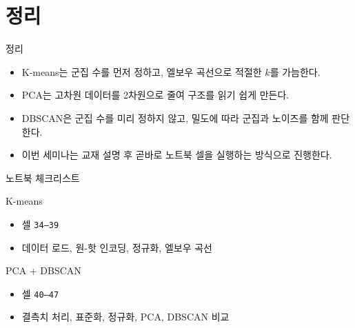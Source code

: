 \documentclass[aspectratio=169]{beamer}
\begin{document}
\section{정리}
\begin{frame}{정리}
\begin{itemize}
    \item K-means는 군집 수를 먼저 정하고, 엘보우 곡선으로 적절한 \(k\)를 가늠한다.
    \item PCA는 고차원 데이터를 2차원으로 줄여 구조를 읽기 쉽게 만든다.
    \item DBSCAN은 군집 수를 미리 정하지 않고, 밀도에 따라 군집과 노이즈를 함께 판단한다.
    \item 이번 세미나는 교재 설명 후 곧바로 노트북 셀을 실행하는 방식으로 진행한다.
\end{itemize}
\end{frame}

\begin{frame}{노트북 체크리스트}
\begin{block}{K-means}
\begin{itemize}
    \item 셀 \texttt{34--39}
    \item 데이터 로드, 원-핫 인코딩, 정규화, 엘보우 곡선
\end{itemize}
\end{block}
\begin{block}{PCA + DBSCAN}
\begin{itemize}
    \item 셀 \texttt{40--47}
    \item 결측치 처리, 표준화, 정규화, PCA, DBSCAN 비교
\end{itemize}
\end{block}
\end{frame}
\end{document}
